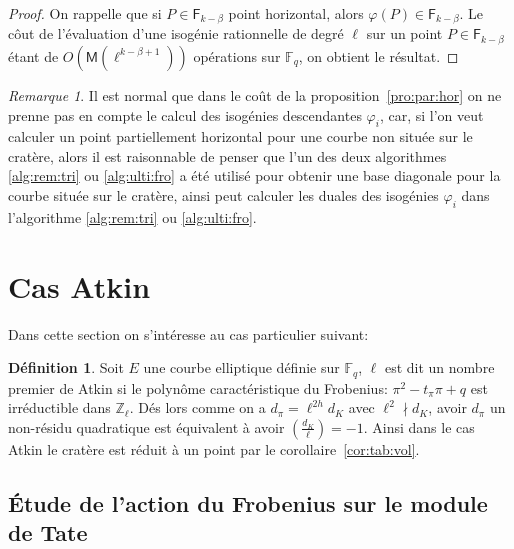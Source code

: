 \documentclass[10pt,a4paper]{book}
\theoremstyle{plain}
\theoremstyle{definition}
\theoremstyle{definition}
\theoremstyle{definition}
\theoremstyle{definition}
\newtheorem{defi}[thm]{Définition}
\theoremstyle{remark}
\newtheorem{rem}[thm]{Remarque}
\theoremstyle{remark}
\theoremstyle{definition}
\begin{document}
\begin{proof}
On rappelle que si $P \in \mathsf{F}_{k-\beta}$ point horizontal, alors 
$\varphi(P) \in \mathsf{F}_{k-\beta}$. Le côut de l'évaluation d'une isogénie 
rationnelle de degré $\ell$ sur un point $P \in \mathsf{F}_{k-\beta}$ étant de 
$O(\mathsf{M}(\ell^{k-\beta+1}))$ opérations sur $\mathbb{F}_q$, on obtient le résultat.
\end{proof}

\begin{rem}
Il est normal que dans le coût de la proposition~\ref{pro:par:hor} on ne prenne
pas en compte le calcul des isogénies descendantes $\varphi_i$, car, si l'on 
veut calculer un point partiellement horizontal pour une courbe non située sur 
le cratère, alors il est raisonnable de penser que l'un des deux algorithmes 
\ref{alg:rem:tri} ou \ref{alg:ulti:fro} a été utilisé pour obtenir une base 
diagonale pour la courbe située sur le cratère, ainsi peut calculer les duales 
des isogénies $\varphi_i$ dans l'algorithme \ref{alg:rem:tri} ou \ref{alg:ulti:fro}.
\end{rem}
\section{Cas Atkin}
\label{subs:atk:dir}
Dans cette section on s'intéresse au cas particulier suivant: 
\begin{defi}
\label{def:cas:atk}
Soit $E$ une courbe elliptique définie sur $\mathbb{F}_q$, $\ell$ est dit un 
nombre premier de Atkin si le polynôme caractéristique du Frobenius: 
$\pi^2-t_{\pi}\pi + q$ est irréductible dans $\mathbb{Z}_{\ell}$. Dés lors 
comme on a $d_{\pi}=\ell^{2h}d_{K}$ avec $\ell^2 \nmid d_{K}$, avoir 
$d_{\pi}$ un non-résidu quadratique est équivalent à avoir $\left( 
\frac{d_{K}}{\ell} \right)=-1$. Ainsi dans le cas Atkin le cratère est réduit à
un point par le corollaire~\ref{cor:tab:vol}.
\end{defi}

\subsection{\'Etude de l'action du Frobenius sur le module de Tate}
\end{document}
